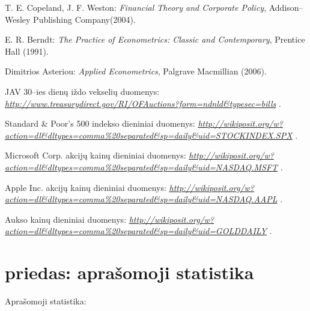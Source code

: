 \documentclass[12pt, a14paper, lithuanian]{article}
\begin{document}
\begin{thebibliography}{99}
\label{mySection}
 T. E. Copeland, J. F. Weston:
\emph{Financial Theory and Corporate Policy},
Addison--Wesley Publishing Company(2004).

 E. R. Berndt:
\emph{The Practice of Econometrics: Classic and Contemporary},
Prentice Hall (1991).

 Dimitrios Asteriou:
\emph{Applied Econometrics},
Palgrave Macmillian (2006).

 JAV 30--ies dienų iždo vekselių duomenys:
\emph{ \url{http://www.treasurydirect.gov/RI/OFAuctions?form=ndnld&typesec=bills} }.

 Standard & Poor's 500 indekso dieniniai duomenys:
\emph{ \url{http://wikiposit.org/w?action=dl\&dltypes=comma\%20separated\&sp=daily\&uid=STOCKINDEX.SPX} }.

 Microsoft Corp. akcijų kainų dieniniai duomenys:
\emph{ \url{http://wikiposit.org/w?action=dl\&dltypes=comma\%20separated\&sp=daily\&uid=NASDAQ.MSFT} }.

 Apple Inc. akcijų kainų dieniniai duomenys:
\emph{ \url{http://wikiposit.org/w?action=dl\&dltypes=comma\%20separated\&sp=daily\&uid=NASDAQ.AAPL} }.

 Aukso kainų dieniniai duomenys:
\emph{ \url{http://wikiposit.org/w?action=dl\&dltypes=comma\%20separated\&sp=daily\&uid=GOLDDAILY} }.

\end{thebibliography}


\newpage

\appendix

\section{priedas: aprašomoji statistika}
\label{A 1}
Aprašomoji statistika:
\end{document}
